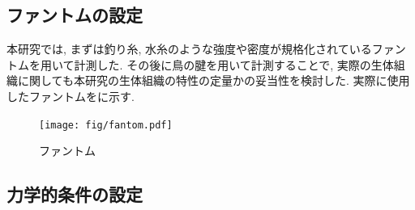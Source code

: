 \subsection{ファントムの設定}
本研究では, まずは釣り糸, 水糸のような強度や密度が規格化されているファントムを用いて計測した. その後に鳥の腱を用いて計測することで, 実際の生体組織に関しても本研究の生体組織の特性の定量かの妥当性を検討した. 実際に使用したファントムをに示す.
\begin{figure}[H]
  \begin{center}
    \texttt{[image: fig/fantom.pdf]}
  \end{center}
  \caption{ファントム}
\end{figure}
\subsection{力学的条件の設定}
